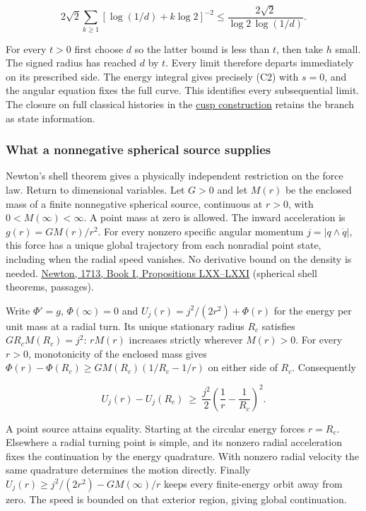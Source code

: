 \documentclass[11pt,a4paper]{article}
\begin{document}
\[
 2\sqrt2\sum_{k\ge1}[\log(1/d)+k\log2]^{-2}
 \le \frac{2\sqrt2}{\log2\,\log(1/d)} . \tag{C4}
\]

For every \(t>0\) first choose \(d\) so the latter bound is less than
\(t\), then take \(h\) small. The signed radius has reached \(d\) by
\(t\). Every limit therefore departs immediately on its prescribed side.
The energy integral gives precisely (C2) with \(s=0\), and the angular
equation fixes the full curve. This identifies every subsequential
limit. The closure on full classical histories in the
\href{newton-cusp-preparation-floor.md}{cusp construction} retains the
branch as state information.

\subsubsection{What a nonnegative spherical source
supplies}\label{what-a-nonnegative-spherical-source-supplies}

Newton's shell theorem gives a physically independent restriction on the
force law. Return to dimensional variables. Let \(G>0\) and let \(M(r)\)
be the enclosed mass of a finite nonnegative spherical source,
continuous at \(r>0\), with \(0<M(\infty)<\infty\). A point mass at zero
is allowed. The inward acceleration is \(g(r)=GM(r)/r^2\). For every
nonzero specific angular momentum \(j=|q\wedge\dot q|\), this force has
a unique global trajectory from each nonradial point state, including
when the radial speed vanishes. No derivative bound on the density is
needed.
\href{https://www.newtonproject.ox.ac.uk/view/texts/diplomatic/NATP00082\#par469}{Newton,
1713, Book I, Propositions LXX--LXXI} (spherical shell theorems,
passages).

Write \(\Phi'=g\), \(\Phi(\infty)=0\) and \(U_j(r)=j^2/(2r^2)+\Phi(r)\)
for the energy per unit mass at a radial turn. Its unique stationary
radius \(R_c\) satisfies \(GR_c M(R_c)=j^2\): \(rM(r)\) increases
strictly wherever \(M(r)>0\). For every \(r>0\), monotonicity of the
enclosed mass gives \(\Phi(r)-\Phi(R_c)\ge GM(R_c)(1/R_c-1/r)\) on
either side of \(R_c\). Consequently

\[
 U_j(r)-U_j(R_c)\ \ge\ \frac{j^2}{2}
               \left(\frac1r-\frac1{R_c}\right)^2 . \tag{C5}
\]

A point source attains equality. Starting at the circular energy forces
\(r=R_c\). Elsewhere a radial turning point is simple, and its nonzero
radial acceleration fixes the continuation by the energy quadrature.
With nonzero radial velocity the same quadrature determines the motion
directly. Finally \(U_j(r)\ge j^2/(2r^2)-GM(\infty)/r\) keeps every
finite-energy orbit away from zero. The speed is bounded on that
exterior region, giving global continuation.
\end{document}
